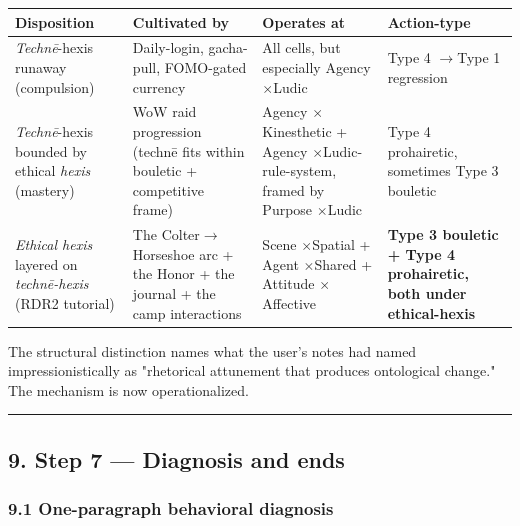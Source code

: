 \documentclass[11pt]{report}
\begin{document}
\begin{table}[H]
\small
\renewcommand{\arraystretch}{1.25}
\begin{tabularx}{\textwidth}{>{\RaggedRight\arraybackslash}X>{\RaggedRight\arraybackslash}X>{\RaggedRight\arraybackslash}X>{\RaggedRight\arraybackslash}X}
\toprule
Disposition & Cultivated by & Operates at & Action-type \\
\midrule
\textit{Technē}-hexis runaway (compulsion) & Daily-login, gacha-pull, FOMO-gated currency & All cells, but especially Agency $\times$\allowbreak  Ludic & Type 4 $\rightarrow$\allowbreak  Type 1 regression \\
\textit{Technē}-hexis bounded by ethical \textit{hexis} (mastery) & WoW raid progression (technē fits within bouletic + competitive frame) & Agency $\times$\allowbreak  Kinesthetic + Agency $\times$\allowbreak  Ludic-rule-system, framed by Purpose $\times$\allowbreak  Ludic & Type 4 prohairetic, sometimes Type 3 bouletic \\
\textit{Ethical hexis} layered on \textit{technē-hexis} (RDR2 tutorial) & The Colter$\rightarrow$\allowbreak Horseshoe arc + the Honor + the journal + the camp interactions & Scene $\times$\allowbreak  Spatial + Agent $\times$\allowbreak  Shared + Attitude $\times$\allowbreak  Affective & \textbf{Type 3 bouletic + Type 4 prohairetic, both under ethical-hexis} \\
\bottomrule
\end{tabularx}
\end{table}


The structural distinction names what the user's notes had named impressionistically as "rhetorical attunement that produces ontological change." The mechanism is now operationalized.


\vspace{0.4em}\hrule\vspace{0.8em}


\subsection{9. Step 7 — Diagnosis and ends}


\subsubsection{9.1 One-paragraph behavioral diagnosis}
\end{document}
